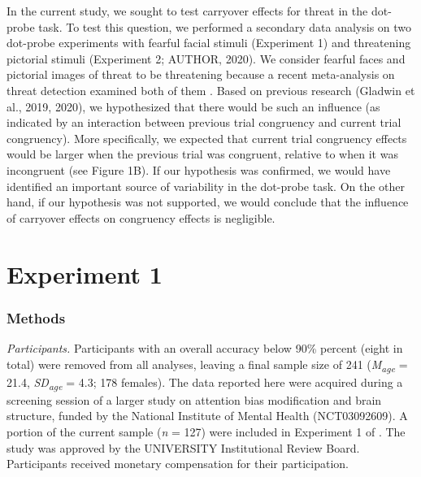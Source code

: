 \documentclass{article}
\begin{document}
	In the current study, we sought to test {\color{4472C4}carryover effects for threat in the }dot-probe task. To test this question, we performed a secondary data analysis on two dot-probe experiments with fearful facial stimuli (Experiment 1) and threatening pictorial stimuli (Experiment 2; AUTHOR, 2020). {\color{4472C4}We consider fearful faces and pictorial images of threat to be threatening because a recent meta-analysis on threat detection examined both of them }\textcite{[object Object]}{\color{4472C4}. }Based on previous research \parencites{Gladwin2019b}{Gladwin2020a}(Gladwin et al., 2019, 2020), we hypothesized that there would be such an influence (as indicated by an interaction between previous trial congruency and current trial congruency). More specifically, we expected that current trial congruency effects would be larger when the previous trial was congruent, relative to when it was incongruent (see Figure 1B). If our hypothesis was confirmed, we would have identified an important source of variability in the dot-probe task. On the other hand, if our hypothesis was not supported, {\color{4472C4}we would conclude that the influence of carryover effects on congruency effects is negligible.}



	\section{Experiment 1}



	\subsubsection{Methods}



	\emph{Participants. }Participants with an overall accuracy below 90\% percent (eight in total) were removed from all analyses, leaving a final sample size of 241 (\emph{M}\textsubscript{\emph{age}} = 21.4, \emph{SD}\textsubscript{\emph{age}} = 4.3; 178 females). The data reported here were acquired during a screening session of a larger study on attention bias modification and brain structure, funded by the National Institute of Mental Health (NCT03092609). A portion of the current sample (\emph{n} = 127) were included in Experiment 1 of \textcite{[object Object]}. The study was approved by the UNIVERSITY Institutional Review Board. Participants received monetary compensation for their participation.
\end{document}
